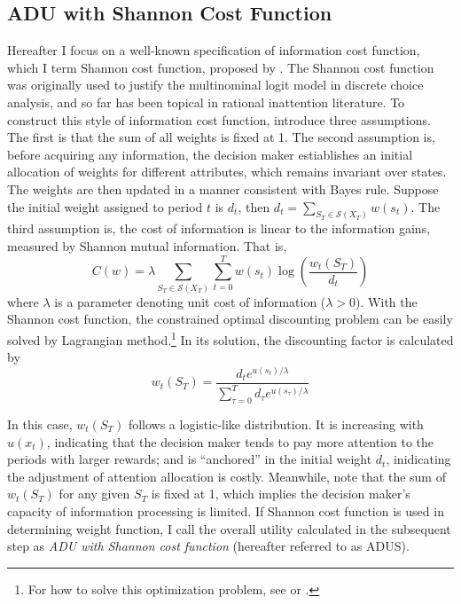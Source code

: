 \documentclass[
  12pt,
]{article}
\begin{document}
\hypertarget{adu-with-shannon-cost-function}{%
\subsection{ADU with Shannon Cost
Function}\label{adu-with-shannon-cost-function}}

Hereafter I focus on a well-known specification of information cost
function, which I term Shannon cost function, proposed by
\citet{matejka_rational_2015}. The Shannon cost function was originally
used to justify the multinominal logit model in discrete choice
analysis, and so far has been topical in rational inattention
literature. To construct this style of information cost function,
\citet{matejka_rational_2015} introduce three assumptions. The first is
that the sum of all weights is fixed at 1. The second assumption is,
before acquiring any information, the decision maker estiablishes an
initial allocation of weights for different attributes, which remains
invariant over states. The weights are then updated in a manner
consistent with Bayes rule. Suppose the initial weight assigned to
period \(t\) is \(d_t\), then
\(d_t=\sum_{S_T\in \mathcal{S}(X_T)} w(s_t)\). The third assumption is,
the cost of information is linear to the information gains, measured by
Shannon mutual information. That
is,\[ C(w)= \lambda \sum_{S_T\in \mathcal{S}(X_T)}\sum_{t=0}^T w(s_t) \log\left(\frac{w_t(S_T)}{d_t}\right) \]where
\(\lambda\) is a parameter denoting unit cost of information
(\(\lambda>0\)). With the Shannon cost function, the constrained optimal
discounting problem can be easily solved by Lagrangian
method.\footnote{For how to solve this optimization problem, see
  \citet{matejka_rational_2015} or \citet{mackowiak_rational_2023}.} In
its solution, the discounting factor is calculated by
\[ w_t(S_T) =\frac{d_te^{u(s_t)/\lambda}}{\sum_{\tau=0}^T d_\tau e^{u(s_\tau)/\lambda}} \]

In this case, \(w_t(S_T)\) follows a logistic-like distribution. It is
increasing with \(u(x_t)\), indicating that the decision maker tends to
pay more attention to the periods with larger rewards; and is
``anchored'' in the initial weight \(d_t\), inidicating the adjustment
of attention allocation is costly. Meanwhile, note that the sum of
\(w_t(S_T)\) for any given \(S_T\) is fixed at 1, which implies the
decision maker's capacity of information processing is limited. If
Shannon cost function is used in determining weight function, I call the
overall utility calculated in the subsequent step as \emph{ADU with
Shannon cost function} (hereafter referred to as ADUS).
\end{document}

